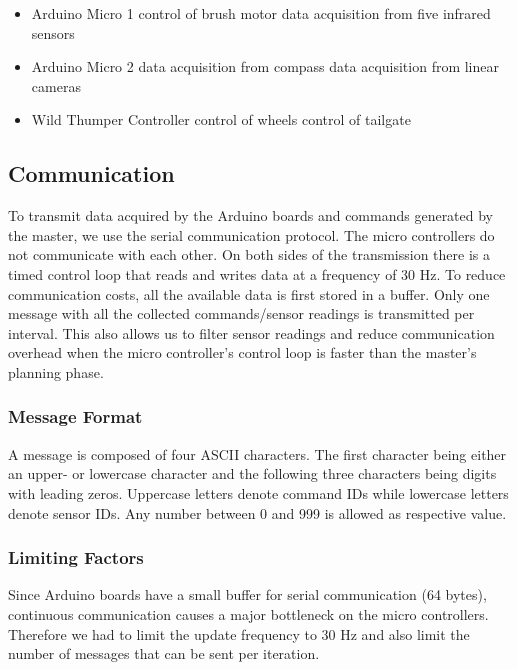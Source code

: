 \begin{itemize}
    \item Arduino Micro 1
    \subitem control of brush motor
    \subitem data acquisition from five infrared sensors
    
    \item Arduino Micro 2
    \subitem data acquisition from compass 
    \subitem data acquisition from linear cameras

    \item Wild Thumper Controller
    \subitem control of wheels
    \subitem control of tailgate
\end{itemize}

\subsection{Communication}
To transmit data acquired by the Arduino boards and commands generated by the master,
we use the serial communication protocol. The micro controllers do not communicate with
each other. On both sides of the transmission there is a timed control loop that reads
and writes data at a frequency of 30 Hz. To reduce communication costs, all the available
data is first stored in a buffer. Only one message with all the collected commands/sensor
readings is transmitted per interval. This also allows us to filter sensor readings
and reduce communication overhead when the micro controller's control loop is faster 
than the master's planning phase.

\subsubsection{Message Format}
A message is composed of four ASCII characters. The first character being either an
upper- or lowercase character and the following three characters being digits with
leading zeros. Uppercase letters denote command IDs while lowercase letters denote
sensor IDs. Any number between 0 and 999 is allowed as respective value. 

\subsubsection{Limiting Factors}
Since Arduino boards have a small buffer for serial communication (64 bytes), continuous
communication causes a major bottleneck on the micro controllers. Therefore we 
had to limit the update frequency to 30 Hz and also limit the number of messages
that can be sent per iteration.


